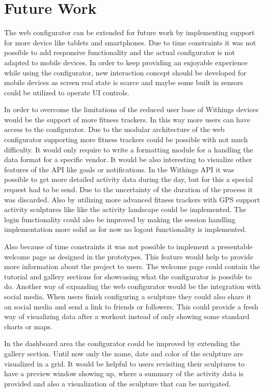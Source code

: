 \documentclass[../medieninformatik-arbeit.tex]{subfiles}
\begin{document}
\section{Future Work}
\label{ch:future}
The web configurator can be extended for future work by implementing support for more device like tablets and smartphones. Due to time constraints it was not possible to add responsive functionality and the actual configurator is not adapted to mobile devices. In order to keep providing an enjoyable experience while using the configurator, new interaction concept should be developed for mobile devices as screen real state is scarce and maybe some built in sensors could be utilized to operate UI controls. 

In order to overcome the limitations of the reduced user base of Withings devices would be the support of more fitness trackers. In this way more users can have access to the configurator. Due to the modular architecture of the web configurator supporting more fitness trackers could be possible with not much difficulty. It would only require to write a formatting module for a handling the data format for a specific vendor. It would be also interesting to visualize other features of the API like goals or notifications. In the Withings API it was possible to get more detailed activity data during the day, but for this a special request had to be send. Due to the uncertainty of the duration of the process it was discarded. Also by utilizing more advanced fitness trackers with GPS support activity sculptures like like the activity landscape could be implemented. The login functionality could also be improved by making the session handling implementation more solid as for now no logout functionality is implemented. 

Also because of time constraints it was not possible to implement a presentable welcome page as designed in the prototypes. This feature would help to provide more information about the project to users. The welcome page could contain the tutorial and gallery sections for showcasing what the configurator is possible to do. Another way of expanding the web configurator would be the integration with social media. When users finish configuring a sculpture they could also share it on social media and send a link to friends or followers. This could provide a fresh way of visualizing data after a workout instead of only showing some standard charts or maps. 

In the dashboard area the configurator could be improved by extending the gallery section. Until now only the name, date and color of the sculpture are visualized in a grid. It would be helpful to users revisiting their sculptures to have a preview window showing up, where a summary of the activity data is provided and also a visualization of the sculpture that can be navigated. 
\end{document}
